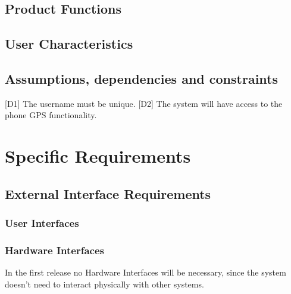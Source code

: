 \documentclass[12pt]{article}
\begin{document}
\subsection{Product Functions}

\subsection{User Characteristics}

\subsection{Assumptions, dependencies and constraints}
[D1] The username must be unique.  
[D2] The system will have access to the phone GPS functionality.

\section{Specific Requirements}

\subsection{External Interface Requirements}

\subsubsection{User Interfaces}

\subsubsection{Hardware Interfaces}
In the first release no Hardware Interfaces will be necessary, since the system doesn't need to interact physically with other systems.
\end{document}
